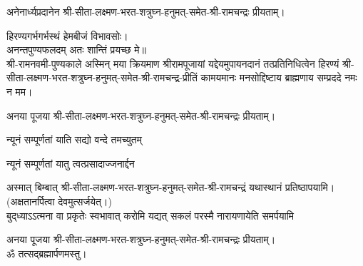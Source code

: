 अनेनार्ध्यप्रदानेन श्री-सीता-लक्ष्मण-भरत-शत्रुघ्न-हनुमत्-समेत-श्री-रामचन्द्रः प्रीयताम्।


हिरण्यगर्भगर्भस्थं हेमबीजं विभावसोः।\\
अनन्तपुण्यफलदम् अतः शान्तिं प्रयच्छ मे॥\\

श्री-रामनवमी-पुण्यकाले अस्मिन् मया क्रियमाण श्रीरामपूजायां यद्देयमुपायनदानं तत्प्रतिनिधित्वेन हिरण्यं श्री-सीता-लक्ष्मण-भरत-शत्रुघ्न-हनुमत्-समेत-श्री-रामचन्द्र-प्रीतिं 
कामयमानः मनसोद्दिष्टाय ब्राह्मणाय सम्प्रददे नमः न मम। 

अनया पूजया श्री-सीता-लक्ष्मण-भरत-शत्रुघ्न-हनुमत्-समेत-श्री-रामचन्द्रः प्रीयताम्। 
 
{न्यूनं सम्पूर्णतां याति सद्यो वन्दे तमच्युतम्} 

{न्यूनं सम्पूर्णतां यातु त्वत्प्रसादाज्जनार्द्दन}

अस्मात् बिम्बात् श्री-सीता-लक्ष्मण-भरत-शत्रुघ्न-हनुमत्-समेत-श्री-रामचन्द्रं यथास्थानं प्रतिष्ठापयामि।\\
(अक्षतानर्पित्वा देवमुत्सर्जयेत्।)\\

{बुद्‌ध्याऽऽत्मना वा प्रकृतेः स्वभावात्}
{करोमि यद्यत् सकलं परस्मै}
{नारायणायेति समर्पयामि}

अनया पूजया श्री-सीता-लक्ष्मण-भरत-शत्रुघ्न-हनुमत्-समेत-श्री-रामचन्द्रः प्रीयताम्। \\
ॐ तत्सद्ब्रह्मार्पणमस्तु।
 
